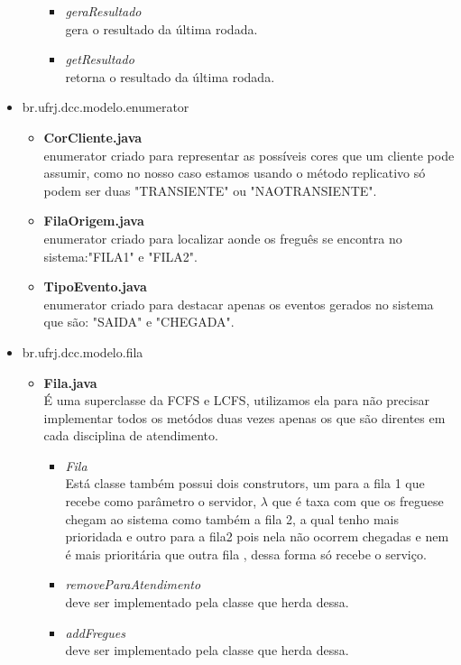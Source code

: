\documentclass[a4paper,10pt]{article}
\begin{document}
\begin{itemize}
\begin{itemize}
\begin{itemize}
			 \item  \textit{geraResultado\\}gera o resultado da última rodada.
			 \item  \textit{getResultado\\}retorna o resultado da última rodada.
		    \end{itemize}
	   \end{itemize}
	  \item br.ufrj.dcc.modelo.enumerator
	    \begin{itemize}
		\item \textbf{CorCliente.java\\} enumerator criado para representar as possíveis cores que um cliente pode assumir, como no nosso caso estamos usando o método replicativo só podem ser duas "TRANSIENTE" ou "NAOTRANSIENTE".
		\item \textbf{FilaOrigem.java\\} enumerator criado para localizar aonde os freguês se encontra no sistema:"FILA1" e "FILA2".
		\item \textbf{TipoEvento.java\\} enumerator criado para destacar apenas os eventos gerados no sistema que são: "SAIDA" e "CHEGADA".
	     \end{itemize}
	  \item br.ufrj.dcc.modelo.fila
	      \begin{itemize}
		\item \textbf{Fila.java\\} É uma super\-classe da FCFS e LCFS, utilizamos ela para não precisar implementar todos os metódos duas vezes apenas os que são direntes em cada disciplina de atendimento. 
		    \begin{itemize}
			 \item \textit{Fila \\} Está classe também possui dois construtors, um para a fila 1 que recebe como parâmetro o servidor, $\lambda$ que é taxa com que os freguese chegam ao sistema como também a fila 2,
						a qual tenho mais prioridada  e outro para a fila2 pois nela não ocorrem chegadas e nem é mais prioritária que outra fila , dessa forma só recebe o serviço.
			 \item \textit{removeParaAtendimento\\} deve ser implementado pela classe que herda dessa.
			 \item \textit{addFregues\\} deve ser implementado pela classe que herda dessa.

\end{itemize}
\end{itemize}
\end{itemize}
\end{document}
